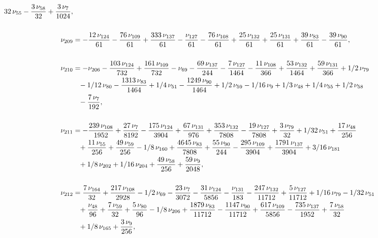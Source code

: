 \documentclass[a4paper,12pt, DIV=14, BCOR=5mm, twoside, headsepline]{scrbook}
\begin{document}
\begin{align}
\begin{aligned}
32\,\nu_{{55}}-{\frac {3\,\nu_{{58}}}{32}}+{\frac {3\,\nu_{{7}}}{1024}
}, \\
\\
\nu_{{209}}&=-{\frac {12\,\nu_{{124}}}{61}}-{\frac {76\,\nu_{{109}}}{
61}}+{\frac {333\,\nu_{{137}}}{61}}-{\frac {\nu_{{127}}}{61}}-{\frac {
76\,\nu_{{108}}}{61}}+{\frac {25\,\nu_{{132}}}{61}}+{\frac {25\,\nu_{{
131}}}{61}}+{\frac {39\,\nu_{{83}}}{61}}-{\frac {39\,\nu_{{90}}}{61}},\\
\\
\nu_{{210}}&=-\nu_{{206}}-{\frac {103\,\nu_{{124}}}{732}}+{\frac {161\,
\nu_{{109}}}{732}}-\nu_{{69}}-{\frac {69\,\nu_{{137}}}{244}}-{\frac {7
\,\nu_{{127}}}{1464}}-{\frac {11\,\nu_{{108}}}{366}}+{\frac {53\,\nu_{
{132}}}{1464}}+{\frac {59\,\nu_{{131}}}{366}}+1/2\,\nu_{{79}}\\
 &\hphantom{=}-1/12\,
\nu_{{80}}-{\frac {1313\,\nu_{{83}}}{1464}}+1/4\,\nu_{{51}}-{\frac {
1249\,\nu_{{90}}}{1464}}+1/2\,\nu_{{59}}-1/16\,\nu_{{9}}+1/3\,\nu_{{48
}}+1/4\,\nu_{{55}}+1/2\,\nu_{{58}}\\
 &\hphantom{=}-{\frac {7\,\nu_{{7}}}{192}}, \\
\\
\nu_{{
211}}&=-{\frac {239\,\nu_{{108}}}{1952}}+{\frac {27\,\nu_{{7}}}{8192}}-
{\frac {175\,\nu_{{124}}}{3904}}+{\frac {67\,\nu_{{131}}}{976}}+{
\frac {353\,\nu_{{132}}}{7808}}-{\frac {19\,\nu_{{127}}}{7808}}+{
\frac {3\,\nu_{{79}}}{32}}+1/32\,\nu_{{51}}+{\frac {17\,\nu_{{48}}}{
256}}\\
 &\hphantom{=}+{\frac {11\,\nu_{{55}}}{256}}+{\frac {49\,\nu_{{59}}}{256}}-1/8
\,\nu_{{160}}+{\frac {4645\,\nu_{{83}}}{7808}}+{\frac {55\,\nu_{{90}}
}{244}}-{\frac {295\,\nu_{{109}}}{3904}}+{\frac {1791\,\nu_{{137}}}{
3904}}+3/16\,\nu_{{181}}\\
 &\hphantom{=}+1/8\,\nu_{{202}}+1/16\,\nu_{{204}}+{\frac {49
\,\nu_{{58}}}{256}}+{\frac {59\,\nu_{{9}}}{2048}}, \\
\\
\nu_{{212}}&={\frac {
7\,\nu_{{164}}}{32}}+{\frac {217\,\nu_{{108}}}{2928}}-1/2\,\nu_{{69}}-
{\frac {23\,\nu_{{7}}}{3072}}-{\frac {31\,\nu_{{124}}}{5856}}-{\frac {
\nu_{{131}}}{183}}-{\frac {247\,\nu_{{132}}}{11712}}+{\frac {5\,\nu_{{
127}}}{11712}}+1/16\,\nu_{{79}}-1/32\,\nu_{{51}}\\
 &\hphantom{=}+{\frac {\nu_{{48}}}{
96}}+{\frac {7\,\nu_{{59}}}{32}}+{\frac {5\,\nu_{{80}}}{96}}-1/8\,\nu_
{{206}}+{\frac {1879\,\nu_{{83}}}{11712}}-{\frac {1147\,\nu_{{90}}}{
11712}}+{\frac {617\,\nu_{{109}}}{5856}}-{\frac {735\,\nu_{{137}}}{
1952}}+{\frac {7\,\nu_{{58}}}{32}}\\
 &\hphantom{=}+1/8\,\nu_{{165}}+{\frac {3\,\nu_{{9
}}}{256}}, 
\end{aligned}
\end{align}
\end{document}
